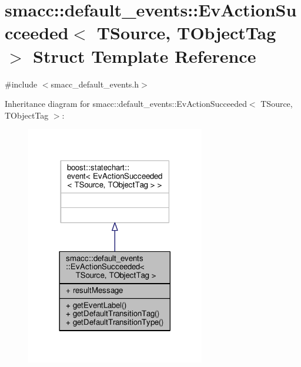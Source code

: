 \hypertarget{structsmacc_1_1default__events_1_1EvActionSucceeded}{}\section{smacc\+:\+:default\+\_\+events\+:\+:Ev\+Action\+Succeeded$<$ T\+Source, T\+Object\+Tag $>$ Struct Template Reference}
\label{structsmacc_1_1default__events_1_1EvActionSucceeded}


{\ttfamily \#include $<$smacc\+\_\+default\+\_\+events.\+h$>$}



Inheritance diagram for smacc\+:\+:default\+\_\+events\+:\+:Ev\+Action\+Succeeded$<$ T\+Source, T\+Object\+Tag $>$\+:\nopagebreak
\begin{figure}[H]
\begin{center}
\leavevmode
\includegraphics[width=221pt]{structsmacc_1_1default__events_1_1EvActionSucceeded__inherit__graph}
\end{center}
\end{figure}


